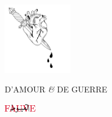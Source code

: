 \documentclass[a5paper,10pt,twoside,french]{book}
\begin{document}
  \maketitle

  \frontmatter

{
\thispagestyle{empty}
\chapter*{}
\thispagestyle{empty}

  \null\vfill           %
    \begin{center}
      \includegraphics[width=3cm]{coeur-poignarde-monochrome.pdf}
 
      \LARGE {D’AMOUR \emph{\&} DE GUERRE}

      \vspace*{20pt}

      \large { \includegraphics[height=1em]{logo-rouge-sur-noir.pdf} }
    \end{center}
    \vspace*{150pt}
  \vfill                %

}
\end{document}
